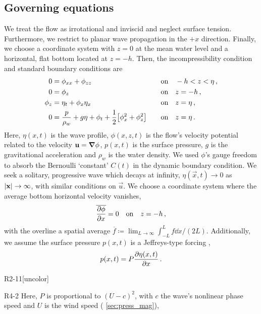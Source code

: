 \documentclass{jfm}
\begin{document}
\subsection{\label{sec:governing} Governing equations}
We treat the flow as irrotational and inviscid and neglect surface
tension.
Furthermore, we restrict to planar wave propagation in the $+x$
direction.
Finally, we choose a coordinate system with $z=0$ at the mean water
level and a horizontal, flat bottom located at $z=-h$.
Then, the incompressibility condition and standard boundary conditions
are
\begin{alignat}{2}
  0 &= \phi_{xx} + \phi_{zz} &&\qq{on}
  -h < z < \eta \,, \label{eq:laplace}\\
  0 &= \phi_{z} &&\qq{on} z=-h \,, \label{eq:bottom_bc}\\
  \phi_{z} &= \eta_{t} + \phi_{x} \eta_{x} &&\qq{on} z = \eta \,,
  \label{eq:kinematic_bc}\\
  0 &= \frac{p}{\rho_w} + g\eta + \phi_{t} +
  \frac{1}{2} \bqty{\phi_{x}^2 + \phi_{z}^2} &&\qq{on} z=
  \eta \,. \label{eq:dynamic_bc}
\end{alignat}
Here, $\eta(x,t)$ is the wave profile, $\phi(x,z,t)$ is the flow's
velocity potential related to the velocity $\mathbf{\bm{u}} = \grad{\phi}$,
$p(x,t)$ is the surface pressure, $g$ is the gravitational acceleration
and $\rho_w$ is the water density.
We used $\phi$'s gauge freedom to absorb the Bernoulli `constant'
$C(t)$ in the dynamic boundary condition.
We seek a solitary, progressive wave which decays at infinity,
$\eta(\vec{x},t) \to 0$ as $\abs{\mathbf{\bm{x}}} \to \infty$, with similar
conditions on $\vec{u}$.
We choose a coordinate system where the average bottom horizontal
velocity vanishes,
\begin{equation}
  \overline{ \pdv{\phi}{x} } = 0 \qq{on} z=-h \,,
  \label{eq:bot_bc_horz}
\end{equation}
with the overline a spatial average $\overline{f} \coloneqq
\lim_{L\to\infty} \int_{-L}^{L} f \dd{x} / (2L)$.
Additionally, we assume the surface pressure $p(x,t)$ is a Jeffreys-type
forcing \citep{jeffreys1925formation},
\begin{equation}
  p(x,t) = P \pdv{\eta(x,t)}{x} \,.
  \label{eq:press_def}
\end{equation}
\begin{LineLabel}{R2-11}[uncolor]
\begin{LineLabel}{R4-2}
Here, $P$ is proportional to $(U-c)^2$, with $c$ the wave's nonlinear
phase speed and $U$ is the wind speed (\cf{} \cref{sec:press_mag}),
\end{LineLabel}
\end{LineLabel}
\end{document}
